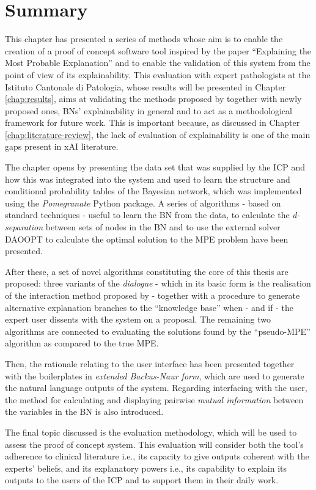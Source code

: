 \section{Summary}
This chapter has presented a series of methods whose aim is to enable the creation of a proof of concept software tool inspired by the paper \enquote{Explaining the Most Probable Explanation} \citep{Butz2018} and to enable the validation of this system from the point of view of its explainability.
This evaluation with expert pathologists at the Istituto Cantonale di Patologia, whose results will be presented in Chapter \ref{chap:results}, aims at validating the methods proposed by \citet{Butz2018} together with newly proposed ones, BNs' explainability in general and to act as a methodological framework for future work.
This is important because, as discussed in Chapter \ref{chap:literature-review}, the lack of evaluation of explainability is one of the main gaps present in xAI literature.

The chapter opens by presenting the data set that was supplied by the ICP and how this was integrated into the system and used to learn the structure and conditional probability tables of the Bayesian network, which was implemented using the \textit{Pomegranate} Python package.
A series of algorithms - based on standard techniques - useful to learn the BN from the data, to calculate the \textit{d-separation} between sets of nodes in the BN and to use the external solver DAOOPT to calculate the optimal solution to the MPE problem have been presented.

After these, a set of novel algorithms constituting the core of this thesis are proposed: three variants of the \textit{dialogue} - which in its basic form is the realisation of the interaction method proposed by \citet{Butz2018} - together with a procedure to generate alternative explanation branches to the \enquote{knowledge base} when - and if - the expert user dissents with the system on a proposal.
The remaining two algorithms are connected to evaluating the solutions found by the \enquote{pseudo-MPE} algorithm as compared to the true MPE.

Then, the rationale relating to the user interface has been presented together with the boilerplates in \textit{extended Backus-Naur form}, which are used to generate the natural language outputs of the system.
Regarding interfacing with the user, the method for calculating and displaying pairwise \textit{mutual information} between the variables in the BN is also introduced.

The final topic discussed is the evaluation methodology, which will be used to assess the proof of concept system.
This evaluation will consider both the tool's adherence to clinical literature i.e., its capacity to give outputs coherent with the experts' beliefs, and its explanatory powers i.e., its capability to explain its outputs to the users of the ICP and to support them in their daily work.

